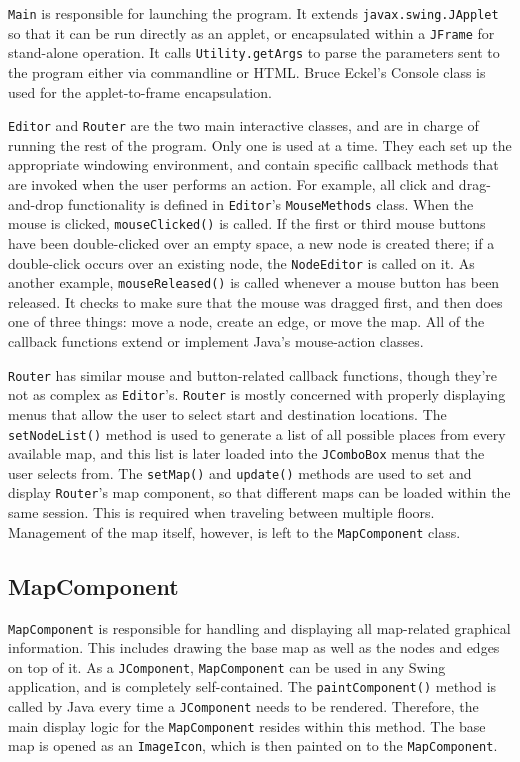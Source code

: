 \documentclass[12pt,letterpaper,titlepage]{article}   %
\begin{document}
\texttt{Main} is responsible for launching the program. It extends
\texttt{javax.swing.JApplet} so that it can be run directly as an applet, or
encapsulated within a \texttt{JFrame} for stand-alone operation. It calls
\texttt{Utility.getArgs} to parse the parameters sent to the program either via
commandline or HTML. Bruce Eckel's Console class is used for the
applet-to-frame encapsulation. \cite{tij}

\texttt{Editor} and \texttt{Router} are the two main interactive classes,
and are in
charge of running the rest of the program. Only one is used at a time.
They each set up the appropriate windowing environment, and contain
specific callback methods that are invoked when the user performs an
action. For example, all click and drag-and-drop functionality is
defined in \texttt{Editor}'s \texttt{MouseMethods} class. When the mouse
is clicked,
\texttt{mouseClicked()} is called. If the first or third mouse buttons have been
double-clicked over an empty space, a new node is created there; if a
double-click occurs over an existing node, the \texttt{NodeEditor} is called on
it. As another example, \texttt{mouseReleased()} is called whenever a mouse
button has been released. It checks to make sure that the mouse was
dragged first, and then does one of three things: move a node, create an
edge, or move the map. All of the callback functions extend or implement
Java's mouse-action classes.

\texttt{Router} has similar mouse and button-related callback functions, though
they're not as complex as \texttt{Editor}'s. \texttt{Router} is mostly 
concerned with
properly displaying menus that allow the user to select start and
destination locations. The \texttt{setNodeList()} method is used to generate a
list of all possible places from every available map, and this list is
later loaded into the \texttt{JComboBox} menus that the user selects from. The
\texttt{setMap()} and \texttt{update()} methods are used to set and display 
\texttt{Router}'s map
component, so that different maps can be loaded within the same session.
This is required when traveling between multiple floors. Management of
the map itself, however, is left to the \texttt{MapComponent} class.

\subsection{MapComponent}

\texttt{MapComponent} is responsible for handling and displaying all map-related
graphical information. This includes drawing the base map as well as the
nodes and edges on top of it. As a \texttt{JComponent}, \texttt{MapComponent}
can be used
in any Swing application, and is completely self-contained. The
\texttt{paintComponent()} method is called by Java every time a
\texttt{JComponent} needs to
be rendered. Therefore, the main display logic for the 
\texttt{MapComponent}
resides within this method. The base map is opened as an  \texttt{ImageIcon},
which is then painted on to the \texttt{MapComponent}.
\end{document}
